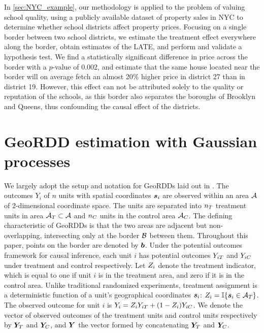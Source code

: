 In \autoref{sec:NYC_example}, our methodology is applied to the problem of valuing school quality, 
using a publicly available dataset of property sales in NYC to determine whether school districts affect property prices.
Focusing on a single border between two school districts, we estimate the treatment effect everywhere along the border, obtain estimates of the LATE, and perform and validate a hypothesis test.
We find a statistically significant difference in price across the border with a \(p\)-value of 0.002, and estimate that the same house located near the border will on average fetch an almost 20\% higher price in district 27 than in district 19.
However, this effect can not be attributed solely to the quality or reputation of the schools, as this border also separates the boroughs of Brooklyn and Queens, thus confounding the causal effect of the districts.



\section{GeoRDD estimation with Gaussian processes}
\label{sec:geordd_estimation}

We largely adopt the setup and notation for GeoRDDs laid out in \cite{keele_titiunik_2015}.
The outcomes \(Y_i\) of \(n\) units with spatial coordinates \(\bm{s}_i\) are observed within an area \(\mathcal{A}\) of 2-dimensional coordinate space.
The units are separated into \(n_T\) treatment units in area \(\mathcal{A}{}_{T} \subset \mathcal{A}\)
and \(n_C\) units in the control area \(\mathcal{A}{}_{C}\).
The defining characteristic of GeoRDDs is that the two areas are adjacent but non-overlapping, intersecting only at the border \(\mathcal{B}\) between them.
Throughout this paper, points on the border are denoted by \(\bm{b}\).
Under the potential outcomes framework for causal inference, each unit \(i\) has potential outcomes \(Y_{iT}\) and \(Y_{iC}\) under treatment and control respectively.
Let \(Z_i\) denote the treatment indicator, which is equal to one if unit \(i\) is in the treatment area, and zero if it is in the control area.
Unlike traditional randomized experiments, treatment assignment is a deterministic function of a unit's geographical coordinates \(\bm{s}_i\): \(\treatind_i = \Ind\cbr{\svec_i \in \treatarea}\).
The observed outcome for unit \(i\) is \(Y_i = Z_i Y_{iT} + (1 - Z_i) Y_{iC}\).
We denote the vector of observed outcomes of the treatment units and control units respectively by \(\bm{Y}_{T}\) and \(\bm{Y}_{C}\), and \(\bm{Y}\) the vector formed by concatenating \(\bm{Y}_{T}\) and \(\bm{Y}_{C}\).

